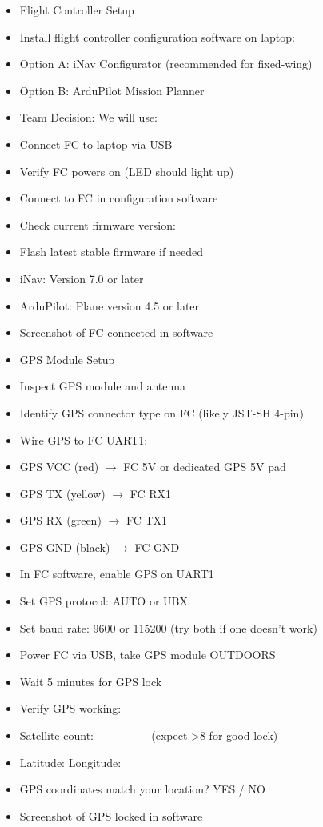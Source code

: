 \documentclass[11pt,letterpaper]{article}
\begin{document}
\begin{itemize}
  \item Flight Controller Setup
  \item Install flight controller configuration software on laptop:
  \item Option A: iNav Configurator (recommended for fixed-wing)
  \item Option B: ArduPilot Mission Planner
  \item Team Decision: We will use: \underline{\hspace{2.25cm}}
  \item Connect FC to laptop via USB
  \item Verify FC powers on (LED should light up)
  \item Connect to FC in configuration software
  \item Check current firmware version: \underline{\hspace{2.25cm}}
  \item Flash latest stable firmware if needed
  \item iNav: Version 7.0 or later
  \item ArduPilot: Plane version 4.5 or later
  \item Screenshot of FC connected in software
\end{itemize}

\begin{itemize}
  \item GPS Module Setup
  \item Inspect GPS module and antenna
  \item Identify GPS connector type on FC (likely JST-SH 4-pin)
  \item Wire GPS to FC UART1:
  \item GPS VCC (red) $\rightarrow$ FC 5V or dedicated GPS 5V pad
  \item GPS TX (yellow) $\rightarrow$ FC RX1
  \item GPS RX (green) $\rightarrow$ FC TX1
  \item GPS GND (black) $\rightarrow$ FC GND
  \item In FC software, enable GPS on UART1
  \item Set GPS protocol: AUTO or UBX
  \item Set baud rate: 9600 or 115200 (try both if one doesn't work)
  \item Power FC via USB, take GPS module OUTDOORS
  \item Wait 5 minutes for GPS lock
  \item Verify GPS working:
  \item Satellite count: \_\_\_\_\_\_ (expect >8 for good lock)
  \item Latitude: \underline{\hspace{2.1cm}}  Longitude: \underline{\hspace{2.1cm}}
  \item GPS coordinates match your location? YES / NO
  \item Screenshot of GPS locked in software
\end{itemize}
\end{document}
